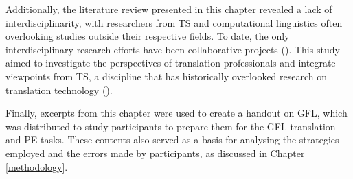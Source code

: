 Additionally, the literature review presented in this chapter revealed a lack of interdisciplinarity, with researchers from TS and computational linguistics often overlooking studies outside their respective fields. To date, the only interdisciplinary research efforts have been collaborative projects (\cite{burtscher-2022-genderfairmt,gromann2023participatory}). This study aimed to investigate the perspectives of translation professionals and integrate viewpoints from TS, a discipline that has historically overlooked research on translation technology (\cite{rozmyslowicz2024politics}).

Finally, excerpts from this chapter were used to create a handout on GFL, which was distributed to study participants to prepare them for the GFL translation and PE tasks. These contents also served as a basis for analysing the strategies employed and the errors made by participants, as discussed in Chapter \ref{methodology}.

